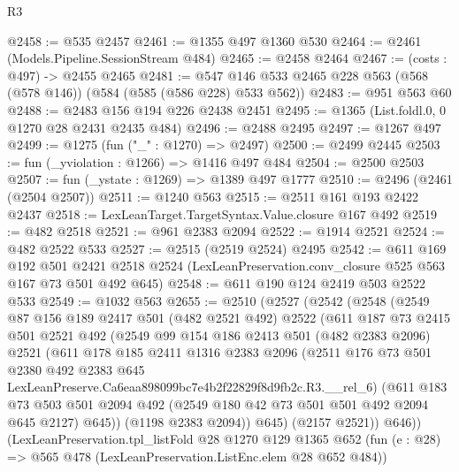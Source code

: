 \begin{lexlean}{R3}
\begin{coremodule}
@2458 := @535 @2457
@2461 := @1355 @497 @1360 @530
@2464 := @2461 (Models.Pipeline.SessionStream @484)
@2465 := @2458 @2464
@2467 := (costs : @497) -> @2455 @2465
@2481 := @547 @146 @533 @2465 @228 @563 (@568 (@578 @146)) (@584 (@585 (@586 @228) @533 @562))
@2483 := @951 @563 @60
@2488 := @2483 @156 @194 @226 @2438 @2451
@2495 := @1365 (List.foldl.{0, 0} @1270 @28 @2431 @2435 @484)
@2496 := @2488 @2495
@2497 := @1267 @497
@2499 := @1275 (fun ("_" : @1270) => @2497)
@2500 := @2499 @2445
@2503 := fun (_yviolation : @1266) => @1416 @497 @484
@2504 := @2500 @2503
@2507 := fun (_ystate : @1269) => @1389 @497 @1777
@2510 := @2496 (@2461 (@2504 @2507))
@2511 := @1240 @563
@2515 := @2511 @161 @193 @2422 @2437
@2518 := LexLeanTarget.TargetSyntax.Value.closure @167 @492
@2519 := @482 @2518
@2521 := @961 @2383 @2094
@2522 := @1914 @2521
@2524 := @482 @2522 @533
@2527 := @2515 (@2519 @2524) @2495
@2542 := @611
    @169
    @192
    @501
    @2421
    @2518
    @2524
    (LexLeanPreservation.conv_closure @525 @563 @167 @73 @501 @492 @645)
@2548 := @611 @190 @124 @2419 @503 @2522 @533
@2549 := @1032 @563
@2655 := @2510
    (@2527
      (@2542
        (@2548
          (@2549
            @87
            @156
            @189
            @2417
            @501
            (@482 @2521 @492)
            @2522
            (@611
              @187
              @73
              @2415
              @501
              @2521
              @492
              (@2549
                @99
                @154
                @186
                @2413
                @501
                (@482 @2383 @2096)
                @2521
                (@611
                  @178
                  @185
                  @2411
                  @1316
                  @2383
                  @2096
                  (@2511
                    @176
                    @73
                    @501
                    @2380
                    @492
                    @2383
                    @645
                    LexLeanPreserve.Ca6eaa898099bc7e4b2f22829f8d9fb2c.R3.__rel_6)
                  (@611
                    @183
                    @73
                    @503
                    @501
                    @2094
                    @492
                    (@2549 @180 @42 @73 @501 @501 @492 @2094 @645 @2127)
                    @645))
                (@1198 @2383 @2094))
              @645)
            (@2157 @2521))
          @646))
      (LexLeanPreservation.tpl_listFold
        @28
        @1270
        @129
        @1365
        @652
        (fun (e : @28) => @565 @478 (LexLeanPreservation.ListEnc.elem @28 @652 @484))

\end{coremodule}
\end{lexlean}

